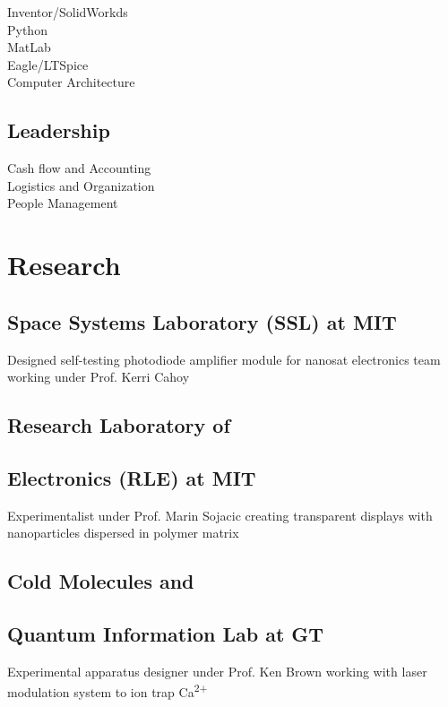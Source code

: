 \documentclass[letterpaper, article]{deedy-resume-openfont}
\begin{document}
\begin{minipage}[t]{0.33\textwidth}
Inventor/SolidWorkds \hspace{.27cm} \textbullet \textbullet  \textbullet \\
Python \hspace{2.5cm} \textbullet \textbullet \textbullet  \textbullet\\
MatLab \hspace{2.42cm} \textbullet \textbullet \textbullet \textbullet  \textbullet\\
Eagle/LTSpice \hspace{1.5cm} \textbullet \textbullet \textbullet \textbullet  \textbullet \\
Computer Architecture \hspace{.09cm} \textbullet \textbullet  \textbullet \\
\sectionsep

\subsection{Leadership}
Cash flow and Accounting \hspace{.55cm} \textbullet \textbullet \textbullet  \textbullet\\
Logistics and Organization \hspace{.5cm} \textbullet \textbullet  \textbullet \\
People Management \hspace{1.38cm} \textbullet \textbullet \textbullet \textbullet  \textbullet


\section{Research}
\subsection{Space Systems Laboratory (SSL) at MIT \hfill}
Designed self-testing photodiode amplifier module for nanosat electronics team working under Prof. Kerri Cahoy
\sectionsep
\subsection{Research Laboratory of \hfill}
\subsection{Electronics (RLE) at MIT \hfill}
Experimentalist under Prof. Marin Sojacic creating transparent displays with nanoparticles dispersed in polymer matrix
\sectionsep
\subsection{Cold Molecules and \hfill}
\subsection{Quantum Information \hfill Lab at GT \hfill}
Experimental apparatus designer under Prof. Ken Brown working with laser modulation system to ion trap Ca\textsuperscript{2+}



\end{minipage}
\end{document}
